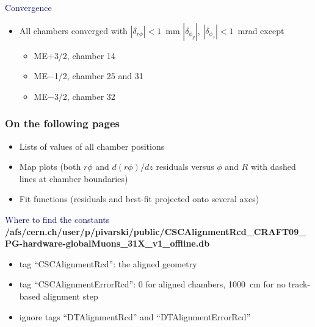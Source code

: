 \documentclass[compress]{beamer}
\begin{document}
\begin{frame}
\begin{itemize}
\end{itemize}

\vfill
\hspace{-0.83 cm} \textcolor{darkblue}{\Large Convergence}
\begin{itemize}
\item All chambers converged with $|\delta_{r\phi}| < 1$~mm
  $|\delta_{\phi_y}|$, $|\delta_{\phi_z}| < 1$~mrad \mbox{except\hspace{-1 cm}}
\begin{itemize}
\item ME$+$3/2, chamber 14
\item ME$-$1/2, chamber 25 and 31
\item ME$-$3/2, chamber 32
\end{itemize}
\end{itemize}
\end{frame}

\begin{frame}
\frametitle{On the following pages}
\begin{itemize}\setlength{\itemsep}{0.5 cm}
\item Lists of values of all chamber positions
\item Map plots (both $r\phi$ and $d(r\phi)/dz$ residuals versus $\phi$ and $R$ with dashed lines at chamber boundaries)
\item Fit functions (residuals and best-fit projected onto several axes)
\end{itemize}

\vfill
\hspace{-0.83 cm} \textcolor{darkblue}{\Large Where to find the constants}
\vspace{0.2 cm}
{\tiny \bf /afs/cern.ch/user/p/pivarski/public/CSCAlignmentRcd\_CRAFT09\_PG-hardware-globalMuons\_31X\_v1\_offline.db}

\begin{itemize}
\item tag ``CSCAlignmentRcd'': the aligned geometry
\item tag ``CSCAlignmentErrorRcd'': 0 for aligned chambers, 1000~cm for no track-based alignment step
\item ignore tags ``DTAlignmentRcd'' and ``DTAlignmentErrorRcd''
\end{itemize}

\label{numpages}
\end{frame}
\end{document}
